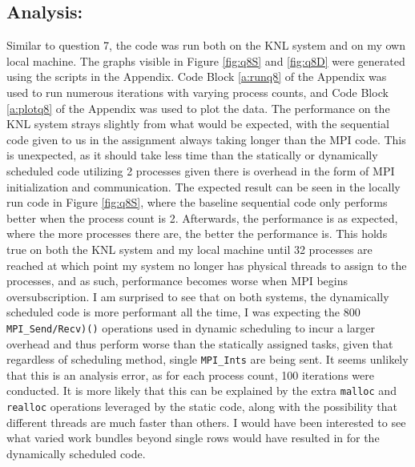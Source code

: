 \documentclass[11pt]{article}
\begin{document}
\subsection*{Analysis:}

Similar to question 7, the code was run both on the KNL system and on my own local machine.
The graphs visible in Figure \ref{fig:q8S} and \ref{fig:q8D} were generated using the scripts in the Appendix. 
Code Block \ref{a:runq8} of the Appendix was used to run numerous iterations with varying process counts, and Code Block \ref{a:plotq8} of the Appendix was used to plot the data.
The performance on the KNL system strays slightly from what would be expected, with the sequential code given to us in the assignment always taking longer than the MPI code. 
This is unexpected, as it should take less time than the statically or dynamically scheduled code utilizing 2 processes given there is overhead in the form of MPI initialization and communication.
The expected result can be seen in the locally run code in Figure \ref{fig:q8S}, where the baseline sequential code only performs better when the process count is 2.
Afterwards, the performance is as expected, where the more processes there are, the better the performance is. 
This holds true on both the KNL system and my local machine until 32 processes are reached at which point my system no longer has physical threads to assign to the processes, and as such, performance becomes worse when MPI begins oversubscription.
I am surprised to see that on both systems, the dynamically scheduled code is more performant all the time, I was expecting the 800 \texttt{MPI\_Send/Recv)()} operations used in dynamic scheduling to incur a larger overhead and thus perform worse than the statically assigned tasks, given that regardless of scheduling method, single \texttt{MPI\_Ints} are being sent.
It seems unlikely that this is an analysis error, as for each process count, 100 iterations were conducted.
It is more likely that this can be explained by the extra \texttt{malloc} and \texttt{realloc} operations leveraged by the static code, along with the possibility that different threads are much faster than others.
I would have been interested to see what varied work bundles beyond single rows would have resulted in for the dynamically scheduled code.
\end{document}
